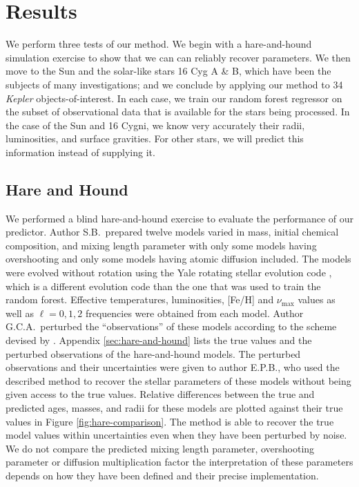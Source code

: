 \documentclass[manuscript,linenumbers]{aastex6}
\newif\ifref
\newcommand{\mb}[1]{\ifref\boldmath\textbf{#1}\unboldmath\else #1\fi}
\begin{document}
\section{Results}
We perform three tests of our method. We begin with a hare-and-hound simulation exercise to show that we can can reliably recover parameters. We then move to the Sun and the solar-like stars 16 Cyg A \& B, which have been the subjects of many investigations; and we conclude by applying our method to 34 \emph{Kepler} objects-of-interest. In each case, we train our random forest regressor on the subset of observational data that is available for the stars being processed. In the case of the Sun and 16 Cygni, we know very accurately their radii, luminosities, and surface gravities. For other stars, we will predict this information instead of supplying it. 


\subsection{Hare and Hound} 
\label{sec:hnh}
We performed a blind hare-and-hound exercise to evaluate the performance of our predictor. Author S.B.\ prepared twelve models varied in mass, initial chemical composition, and mixing length parameter with only some models having overshooting and only some models having atomic diffusion included. The models were evolved without rotation using the Yale rotating stellar evolution code \citep[YREC;][]{2008ApSS.316...31D}, which is a different evolution code than the one that was used to train the random forest. Effective temperatures, luminosities, [Fe/H] and $\nu_{\max}$ values as well as $\ell=0,1,2$ frequencies were obtained from each model. Author G.C.A.\  perturbed the ``observations'' of these models according to the scheme devised by \citet{spaceinn}. \mb{Appendix \ref{sec:hare-and-hound} lists the true values and the perturbed observations of the hare-and-hound models}. The perturbed observations and their uncertainties were given to author E.P.B.\@, who used the described method to recover the stellar parameters of \mb{these} models without being given access to the true values. Relative differences between the true and predicted ages, masses, and radii for these models are plotted against their true values in Figure \ref{fig:hare-comparison}. The method is able to recover the true model values within uncertainties even when they have been perturbed by noise. We do not compare the predicted mixing length parameter, overshooting parameter or diffusion \mb{multiplication} factor \mb{the interpretation of these parameters depends on how they have been defined and their precise implementation.}%
\end{document}
